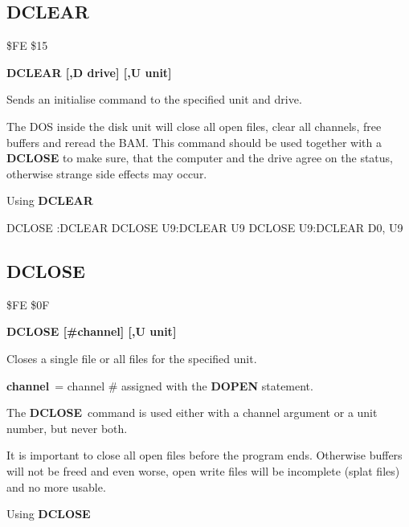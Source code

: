
\newpage
\subsection{DCLEAR}
\begin{description}[leftmargin=3cm,style=nextline]
\item [Token:] \$FE \$15
\item [Format:] {\bf DCLEAR [,D drive] [,U unit] }
\item [Usage:]
   Sends an initialise command to
   the specified unit and drive.

   \drivedefinition

   \unitdefinition

\item [Remarks:]
   The DOS inside the disk unit will close all open files,
   clear all channels, free buffers and reread the BAM.
   This command should be used together with a {\bf DCLOSE}
   to make sure, that the computer and the drive agree
   on the status, otherwise strange side effects may occur.

\item [Example:] Using {\bf DCLEAR}
\begin{screenoutput}
  DCLOSE   :DCLEAR
  DCLOSE U9:DCLEAR U9
  DCLOSE U9:DCLEAR D0, U9
\end{screenoutput}
\end{description}


\newpage
\subsection{DCLOSE}
\begin{description}[leftmargin=3cm,style=nextline]
\item [Token:] \$FE \$0F
\item [Format:] {\bf DCLOSE [\#channel] [,U unit] }
\item [Usage:]
   Closes a single file or
   all files for the specified unit.

   {\bf channel} = channel \# assigned with the {\bf DOPEN} statement.

   \unitdefinition

   The {\bf DCLOSE} command is used either with a channel argument
   or a unit number, but never both.

\item [Remarks:]
   It is important to close all open files before the program ends.
   Otherwise buffers will not be freed and even worse, open write
   files will be incomplete (splat files) and no more usable.

\item [Example:] Using {\bf DCLOSE}
\end{description}

